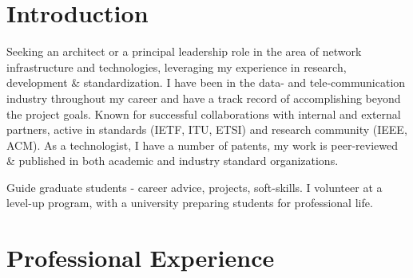 \documentclass[11pt,a4paper,sans]{moderncv} %
\begin{document}
\makecvtitle %
\vspace{-13mm}
\section{Introduction}
 {Seeking an architect or a principal leadership role in the area of network infrastructure and technologies, leveraging my experience in research, development \& standardization.}
 {I have been in the data- and tele-communication industry  throughout my career and have a track record of accomplishing beyond the project goals. Known for successful collaborations with internal and external partners, active in standards (IETF, ITU, ETSI) and research community (IEEE, ACM). \newline As a technologist, I have a number of patents, my work is peer-reviewed \& published in both academic and industry standard organizations.} 

  { Guide graduate students - career advice, projects, soft-skills. I  volunteer at a level-up program, with a university  preparing students for professional life.}




  
\section{Professional Experience}
\end{document}
